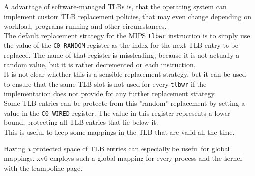 A advantage of software-managed TLBs is, that the operating system can implement custom
TLB replacement policies, that may even change depending on workload, programs running
and other circumstances.\\
The default replacement strategy for the MIPS \texttt{tlbwr} instruction is to simply
use the value of the \texttt{C0\_RANDOM} register as the index for the next TLB entry
to be replaced. The name of that register is missleading, because it is not actually a
random value, but it is rather decremented on each instruction\cite{heiserAnatomyHighPerformanceMicrokernel}.\\
It is not clear whether this is a sensible replacement strategy,
but it can be used to ensure that the same TLB slot is not used for every \texttt{tlbwr} if the implementation
does not provide for any further replacement strategy.\\
Some TLB entries can be protecte from this ''random'' replacement by setting a value in the \texttt{C0\_WIRED}
register. The value in this register represents a lower bound, protecting all TLB entries that lie below it.\\
This is useful to keep some mappings in the TLB that are valid all the time.

Having a protected space of TLB entries can especially be useful for global mappings. xv6 employs such a global
mapping for every process and the kernel with the trampoline page.










